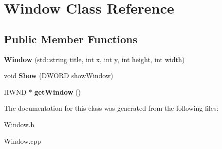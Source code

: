 \hypertarget{class_window}{\section{Window Class Reference}
\label{class_window}
}
\subsection*{Public Member Functions}
\begin{DoxyCompactItemize}
\item 
\hypertarget{class_window_ad46ecfdc06e4cac67aa6ae07291779cf}{{\bfseries Window} (std\-::string title, int x, int y, int height, int width)}\label{class_window_ad46ecfdc06e4cac67aa6ae07291779cf}

\item 
\hypertarget{class_window_a8b98475bd5635b4ef7075da5ba6a2ab6}{void {\bfseries Show} (D\-W\-O\-R\-D show\-Window)}\label{class_window_a8b98475bd5635b4ef7075da5ba6a2ab6}

\item 
\hypertarget{class_window_af12cf85792bf1e39e7701ab66bcfe9f2}{H\-W\-N\-D $\ast$ {\bfseries get\-Window} ()}\label{class_window_af12cf85792bf1e39e7701ab66bcfe9f2}

\end{DoxyCompactItemize}


The documentation for this class was generated from the following files\-:\begin{DoxyCompactItemize}
\item 
Window.\-h\item 
Window.\-cpp\end{DoxyCompactItemize}
